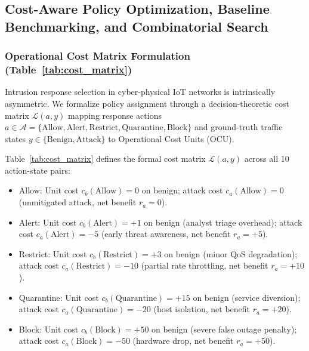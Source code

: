 \documentclass[journal,10pt,onecolumn]{IEEEtran}
\begin{document}
\subsection{Cost-Aware Policy Optimization, Baseline Benchmarking, and Combinatorial Search}

\subsubsection{Operational Cost Matrix Formulation (Table~\ref{tab:cost_matrix})}
Intrusion response selection in cyber-physical IoT networks is intrinsically asymmetric. We formalize policy assignment through a decision-theoretic cost matrix $\mathcal{L}(a, y)$ mapping response actions $a \in \mathcal{A} = \{\text{Allow}, \text{Alert}, \text{Restrict}, \text{Quarantine}, \text{Block}\}$ and ground-truth traffic states $y \in \{\text{Benign}, \text{Attack}\}$ to Operational Cost Units (OCU).

Table~\ref{tab:cost_matrix} defines the formal cost matrix $\mathcal{L}(a, y)$ across all 10 action-state pairs:
\begin{itemize}
    \item Allow: Unit cost $c_b(\text{Allow}) = 0$ on benign; attack cost $c_a(\text{Allow}) = 0$ (unmitigated attack, net benefit $r_a = 0$).
    \item Alert: Unit cost $c_b(\text{Alert}) = +1$ on benign (analyst triage overhead); attack cost $c_a(\text{Alert}) = -5$ (early threat awareness, net benefit $r_a = +5$).
    \item Restrict: Unit cost $c_b(\text{Restrict}) = +3$ on benign (minor QoS degradation); attack cost $c_a(\text{Restrict}) = -10$ (partial rate throttling, net benefit $r_a = +10$).
    \item Quarantine: Unit cost $c_b(\text{Quarantine}) = +15$ on benign (service diversion); attack cost $c_a(\text{Quarantine}) = -20$ (host isolation, net benefit $r_a = +20$).
    \item Block: Unit cost $c_b(\text{Block}) = +50$ on benign (severe false outage penalty); attack cost $c_a(\text{Block}) = -50$ (hardware drop, net benefit $r_a = +50$).
\end{itemize}
\end{document}
